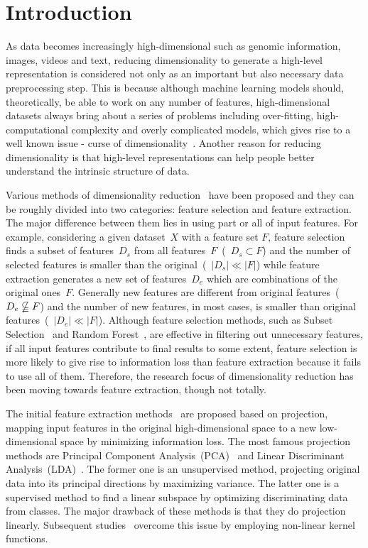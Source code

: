 \documentclass[conference]{IEEEtran}
\begin{document}
	\section{Introduction}
	As data becomes increasingly high-dimensional such as genomic information, images, videos and text, reducing dimensionality to generate a high-level representation is considered not only as an important but also necessary data preprocessing step. This is because although machine learning models should, theoretically, be able to work on any number of features, high-dimensional datasets always bring about a series of problems including over-fitting, high-computational complexity and overly complicated models, which gives rise to a well known issue - curse of dimensionality~\cite{indyk1998approximate}. Another reason for reducing dimensionality is that high-level representations can help people better understand the intrinsic structure of data.
	
	Various methods of dimensionality reduction~\cite{wang2015survey, cunningham2015linear, akkarapatty2016dimensionality,WU:ICDM,WU:IJCNN2} have been proposed and they can be roughly divided into two categories: feature selection and feature extraction. The major difference between them lies in using part or all of input features. For example, considering a given dataset~$X$ with a feature set $F$, feature selection finds a subset of features~$D_{s}$ from all features~$F$~(~$D_{s} \subset F$) and the number of selected features is smaller than the original~(~$|D_{s}| \ll |F|$) while feature extraction generates a new set of features~$D_{e}$ which are combinations of the original ones~$F$. Generally new features are different from original features~(~$D_{e} \nsubseteqq F$) and the number of new features, in most cases, is smaller than original features~(~$|D_{e}| \ll |F|$). Although feature selection methods, such as Subset Selection~\cite{john1994irrelevant} and Random Forest~\cite{liaw2002classification}, are effective in filtering out unnecessary features, if all input features contribute to final results to some extent, feature selection is more likely to give rise to information loss than feature extraction because it fails to use all of them. Therefore, the research focus of dimensionality reduction has been moving towards feature extraction, though not totally.
	
	The initial feature extraction methods~\cite{khalid2014survey} are proposed based on projection, mapping input features in the original high-dimensional space to a new low-dimensional space by minimizing information loss. The most famous projection methods are Principal Component Analysis~(PCA)~\cite{demvsar2013principal} and Linear Discriminant Analysis~(LDA)~\cite{sharma2015linear}. The former one is an unsupervised method, projecting original data into its principal directions by maximizing variance. The latter one is a supervised method to find a linear subspace by optimizing discriminating data from classes. The major drawback of these methods is that they do projection linearly. Subsequent studies~\cite{scholkopf1997kernel, lee2004nonlinear, honeine2012online, lebart2013correspondence, lopez2014randomized} overcome this issue by employing non-linear kernel functions.
	
\end{document}
